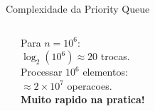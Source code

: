 \documentclass[aspectratio=169,10pt]{beamer}
\begin{document}
\begin{frame}{Complexidade da Priority Queue}
\begin{columns}[c]
\begin{tcolorbox}[caixaAmarelo,title={Comparação geral}]
      \end{tcolorbox}
      \vspace{0.1cm}
      \begin{tcolorbox}[caixaVermelho,title={O(log n) e rapido!}]
        \small
        Para $n = 10^6$:\\
        $\log_2(10^6) \approx 20$ trocas.\\[3pt]
        Processar $10^6$ elementos:\\
        $\approx 2{\times}10^7$ operacoes.\\
        \textbf{Muito rapido na pratica!}
      \end{tcolorbox}
  \end{columns}
\end{frame}

\end{document}
